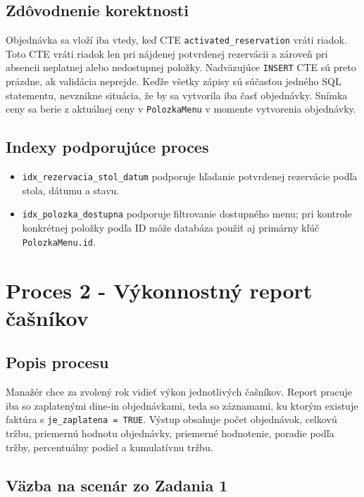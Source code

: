 \documentclass[11pt, a4paper]{article}
\begin{document}
\subsection*{Zdôvodnenie korektnosti}

Objednávka sa vloží iba vtedy, keď CTE \texttt{activated\_reservation} vráti riadok. Toto CTE vráti
riadok len pri nájdenej potvrdenej rezervácii a zároveň pri absencii neplatnej alebo nedostupnej
položky. Nadväzujúce \texttt{INSERT} CTE sú preto prázdne, ak validácia neprejde. Keďže všetky zápisy
sú súčasťou jedného SQL statementu, nevznikne situácia, že by sa vytvorila iba časť objednávky.
Snímka ceny sa berie z aktuálnej ceny v \texttt{PolozkaMenu} v momente vytvorenia objednávky.

\subsection*{Indexy podporujúce proces}

\begin{itemize}
    \item \texttt{idx\_rezervacia\_stol\_datum} podporuje hľadanie potvrdenej rezervácie podľa stola, dátumu a stavu.
    \item \texttt{idx\_polozka\_dostupna} podporuje filtrovanie dostupného menu; pri kontrole konkrétnej položky podľa ID môže databáza použiť aj primárny kľúč \texttt{PolozkaMenu.id}.
\end{itemize}

\clearpage
\section{Proces 2 - Výkonnostný report čašníkov}

\subsection*{Popis procesu}

Manažér chce za zvolený rok vidieť výkon jednotlivých čašníkov. Report pracuje iba so zaplatenými
dine-in objednávkami, teda so záznamami, ku ktorým existuje faktúra s
\texttt{je\_zaplatena = TRUE}. Výstup obsahuje počet objednávok, celkovú tržbu, priemernú hodnotu
objednávky, priemerné hodnotenie, poradie podľa tržby, percentuálny podiel a kumulatívnu tržbu.

\subsection*{Väzba na scenár zo Zadania 1}
\end{document}
